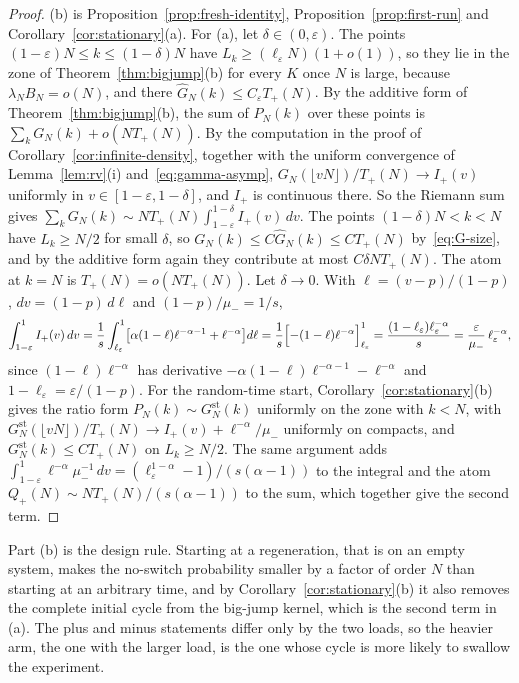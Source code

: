 \begin{proof}
(b) is Proposition~\ref{prop:fresh-identity}, Proposition~\ref{prop:first-run} and
Corollary~\ref{cor:stationary}(a). For (a), let $\delta\in(0,\varepsilon)$. The points
$(1-\varepsilon)N\le k\le(1-\delta)N$ have $L_k\ge(\ell_\varepsilon N)(1+o(1))$, so they lie in
the zone of Theorem~\ref{thm:bigjump}(b) for every $K$ once $N$ is large, because
$\lambda_NB_N=o(N)$, and there $\widehat G_N(k)\le C_\varepsilon T_\plus(N)$. By the additive form
of Theorem~\ref{thm:bigjump}(b), the sum of $P_N(k)$ over these points is
$\sum_kG_N(k)+o(NT_\plus(N))$. By the computation in the proof of
Corollary~\ref{cor:infinite-density}, together with the uniform convergence of
Lemma~\ref{lem:rv}(i) and~\eqref{eq:gamma-asymp}, $G_N(\lfloor vN\rfloor)/T_\plus(N)\to I_\plus(v)$
uniformly in $v\in[1-\varepsilon,1-\delta]$, and $I_\plus$ is continuous there. So the Riemann
sum gives $\sum_kG_N(k)\sim NT_\plus(N)\int_{1-\varepsilon}^{1-\delta}I_\plus(v)\,dv$. The points
$(1-\delta)N<k<N$ have $L_k\ge N/2$ for small $\delta$, so $G_N(k)\le C\widehat G_N(k)\le CT_\plus(N)$
by~\eqref{eq:G-size}, and by the additive form again they contribute at most
$C\delta NT_\plus(N)$. The atom at $k=N$ is $T_\plus(N)=o(NT_\plus(N))$. Let $\delta\to0$. With
$\ell=(v-p)/(1-p)$, $dv=(1-p)\,d\ell$ and $(1-p)/\mu_\minus=1/s$,
\[
 \int_{1-\varepsilon}^{1}I_{+}(v)\,dv=\frac1s\int_{\ell_\varepsilon}^{1}\bigl[\alpha(1-\ell)\ell^{-\alpha-1}+\ell^{-\alpha}\bigr]d\ell
 =\frac1s\Bigl[-(1-\ell)\ell^{-\alpha}\Bigr]_{\ell_\varepsilon}^{1}=\frac{(1-\ell_\varepsilon)\ell_\varepsilon^{-\alpha}}{s}
 =\frac{\varepsilon}{\mu_{-}}\,\ell_\varepsilon^{-\alpha},
\]
since $(1-\ell)\ell^{-\alpha}$ has derivative $-\alpha(1-\ell)\ell^{-\alpha-1}-\ell^{-\alpha}$ and
$1-\ell_\varepsilon=\varepsilon/(1-p)$. For the random-time start, Corollary~\ref{cor:stationary}(b)
gives the ratio form $P_N(k)\sim G^{\mathrm{st}}_N(k)$ uniformly on the zone with $k<N$, with
$G^{\mathrm{st}}_N(\lfloor vN\rfloor)/T_\plus(N)\to I_\plus(v)+\ell^{-\alpha}/\mu_\minus$ uniformly on
compacts, and $G^{\mathrm{st}}_N(k)\le CT_\plus(N)$ on $L_k\ge N/2$. The same argument adds
$\int_{1-\varepsilon}^1\ell^{-\alpha}\mu_\minus^{-1}\,dv=(\ell_\varepsilon^{1-\alpha}-1)/(s(\alpha-1))$ to
the integral and the atom $Q_\plus(N)\sim NT_\plus(N)/(s(\alpha-1))$ to the sum, which together
give the second term.
\end{proof}

Part (b) is the design rule. Starting at a regeneration, that is on an empty system, makes
the no-switch probability smaller by a factor of order $N$ than starting at an arbitrary
time, and by Corollary~\ref{cor:stationary}(b) it also removes the complete initial cycle
from the big-jump kernel, which is the second term in (a). The plus and minus statements
differ only by the two loads, so the heavier arm, the one with the larger load, is the one
whose cycle is more likely to swallow the experiment.

